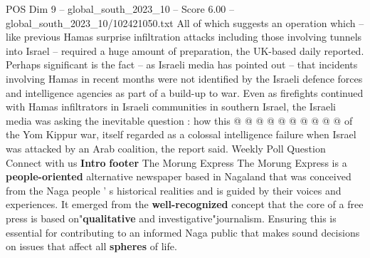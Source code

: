 \begin{textsample}{POS Dim 9 – global\_south\_2023\_10 – Score 6.00 – global\_south\_2023\_10/102421050.txt}
All of which suggests an operation which -- like previous Hamas surprise infiltration attacks including those involving tunnels into Israel -- required a huge amount of preparation, the UK-based daily reported.
Perhaps significant is the fact -- as Israeli media has pointed out -- that incidents involving Hamas in recent months were not identified by the Israeli defence forces and intelligence agencies as part of a build-up to war.
Even as firefights continued with Hamas infiltrators in Israeli communities in southern Israel, the Israeli media was asking the inevitable question : how this @ @ @ @ @ @ @ @ @ @ of the Yom Kippur war, itself regarded as a colossal intelligence failure when Israel was attacked by an Arab coalition, the report said.
Weekly Poll Question Connect with us \textbf{Intro} \textbf{footer} The Morung Express The Morung Express is a \textbf{people-oriented} alternative newspaper based in Nagaland that was conceived from the Naga people ' s historical realities and is guided by their voices and experiences.
It emerged from the \textbf{well-recognized} concept that the core of a free press is based on"\textbf{qualitative} and investigative"journalism.
Ensuring this is essential for contributing to an informed Naga public that makes sound decisions on issues that affect all \textbf{spheres} of life.

\end{textsample}
